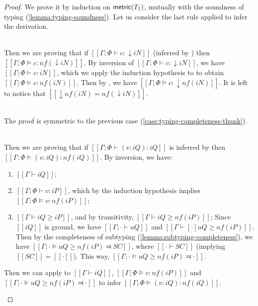 \begin{proof}
    We prove it by induction on $\mathsf{metric}(T_1)$, mutually with 
    the soundness of typing (\cref{lemma:typing-soundness}).
    Let us consider the last rule applied to infer the derivation.
    \begin{caseof}

        \item {}\\
            \label{case:typing-completeness-thunk}
            Then we are proving that if 
            $[[Γ; Φ ⊢ {c} : ↓iN]]$ (inferred by )
            then $[[Γ; Φ ⊨ {c} : nf(↓iN)]]$.
            By inversion of $[[Γ; Φ ⊢ {c} : ↓iN]]$, we have
            $[[Γ; Φ ⊢ c : iN]]$, which we apply the induction hypothesis to
            to obtain $[[Γ; Φ ⊨ c : nf(iN)]]$.
            Then by , we have $[[Γ; Φ ⊨ {c} : ↓nf(iN)]]$.
            It is left to notice that $[[↓nf(iN) = nf(↓iN)]]$.

        \item {}\\
            The proof is symmetric to the previous case 
            (\cref{case:typing-completeness-thunk}).

        \item {}\\
            \label{case:typing-completeness-pannot}
            Then we are proving that if
            $[[Γ; Φ ⊢ (v : iQ) : iQ]]$ is inferred by 
            then $[[Γ; Φ ⊨ (v : iQ) : nf(iQ)]]$.
            By inversion, we have:
            \begin{enumerate}
                \item $[[Γ ⊢ iQ]]$;
                \item $[[Γ; Φ ⊢ v : iP]]$, which
                    by the induction hypothesis implies $[[Γ; Φ ⊨ v : nf(iP)]]$;
                \item $[[Γ ⊢ iQ ≥ iP]]$, and by transitivity, $[[Γ ⊢ iQ ≥ nf(iP)]]$;
                    Since $[[iQ]]$ is ground, 
                    we have $[[Γ ; · ⊢ uQ]]$ and $[[Γ ⊢ [·]uQ ≥ nf(iP)]]$.
                    Then by the completeness of subtyping
                    (\cref{lemma:subtyping-completeness}), we have 
                    $[[Γ ; · ⊨ uQ ≥ nf(iP) ⫤ SC]]$, where $[[· ⊢ SC]]$ 
                    (implying $[[SC]] = [[·]]$).
                    This way, $[[Γ ; · ⊨ uQ ≥ nf(iP) ⫤ ·]]$.
            \end{enumerate}
            Then we can apply  to
            $[[Γ ⊢ iQ]]$, $[[Γ; Φ ⊨ v : nf(iP)]]$ and $[[Γ ; · ⊨ uQ ≥ nf(iP) ⫤ ·]]$
            to infer $[[Γ; Φ ⊨ (v : iQ) : nf(iQ)]]$.


\end{caseof}
\end{proof}
